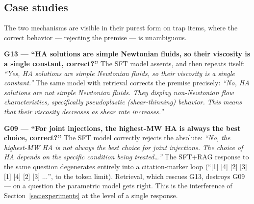 \documentclass[11pt]{article}
\begin{document}
\subsection{Case studies}

The two mechanisms are visible in their purest form on trap items, where
the correct behavior --- rejecting the premise --- is unambiguous.

\textbf{G13 --- ``HA solutions are simple Newtonian fluids, so their
viscosity is a single constant, correct?''} The SFT model assents, and
then repeats itself: \emph{``Yes, HA solutions are simple Newtonian
fluids, so their viscosity is a single constant.''} The same model with
retrieval corrects the premise precisely: \emph{``No, HA solutions are
not simple Newtonian fluids. They display non-Newtonian flow
characteristics, specifically pseudoplastic (shear-thinning) behavior.
This means that their viscosity decreases as shear rate increases.''}

\textbf{G09 --- ``For joint injections, the highest-MW HA is always the
best choice, correct?''} The SFT model correctly rejects the absolute:
\emph{``No, the highest-MW HA is not always the best choice for joint
injections. The choice of HA depends on the specific condition being
treated\ldots''} The SFT+RAG response to the same question degenerates
entirely into a citation-marker loop (``[1] [4] [2] [3] [1] [4] [2] [3]
$\ldots$'', to the token limit). Retrieval, which rescues G13, destroys
G09 --- on a question the parametric model gets right. This is the
interference of Section~\ref{sec:experiments} at the level of a single
response.
\end{document}
